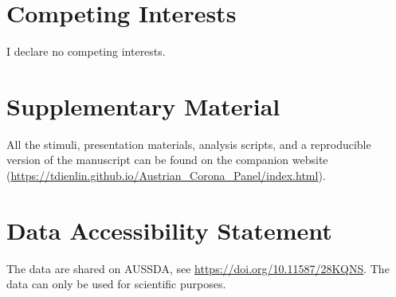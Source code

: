 \documentclass[
  english,
  man,floatsintext]{apa6}
\begin{document}
\newpage

\hypertarget{competing-interests}{%
\section{Competing Interests}\label{competing-interests}}

I declare no competing interests.

\hypertarget{supplementary-material}{%
\section{Supplementary Material}\label{supplementary-material}}

All the stimuli, presentation materials, analysis scripts, and a reproducible version of the manuscript can be found on the companion website (\url{https://tdienlin.github.io/Austrian_Corona_Panel/index.html}).

\hypertarget{data-accessibility-statement}{%
\section{Data Accessibility Statement}\label{data-accessibility-statement}}

The data are shared on AUSSDA, see \url{https://doi.org/10.11587/28KQNS}.
The data can only be used for scientific purposes.
\end{document}
